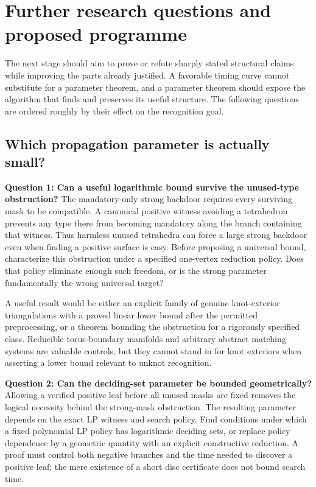 \section{Further research questions and proposed programme}\label{sec:research}

The next stage should aim to prove or refute sharply stated structural claims while improving the parts already justified. A favorable timing curve cannot substitute for a parameter theorem, and a parameter theorem should expose the algorithm that finds and preserves its useful structure. The following questions are ordered roughly by their effect on the recognition goal.

\subsection{Which propagation parameter is actually small?}

\textbf{Question 1: Can a useful logarithmic bound survive the unused-type obstruction?}
The mandatory-only strong backdoor requires every surviving mask to be compatible. A canonical positive witness avoiding a tetrahedron prevents any type there from becoming mandatory along the branch containing that witness. Thus harmless unused tetrahedra can force a large strong backdoor even when finding a positive surface is easy. Before proposing a universal bound, characterize this obstruction under a specified one-vertex reduction policy. Does that policy eliminate enough such freedom, or is the strong parameter fundamentally the wrong universal target?

A useful result would be either an explicit family of genuine knot-exterior triangulations with a proved linear lower bound after the permitted preprocessing, or a theorem bounding the obstruction for a rigorously specified class. Reducible torus-boundary manifolds and arbitrary abstract matching systems are valuable controls, but they cannot stand in for knot exteriors when asserting a lower bound relevant to unknot recognition.

\textbf{Question 2: Can the deciding-set parameter be bounded geometrically?}
Allowing a verified positive leaf before all unused masks are fixed removes the logical necessity behind the strong-mask obstruction. The resulting parameter depends on the exact LP witness and search policy. Find conditions under which a fixed polynomial LP policy has logarithmic deciding sets, or replace policy dependence by a geometric quantity with an explicit constructive reduction. A proof must control both negative branches and the time needed to discover a positive leaf; the mere existence of a short disc certificate does not bound search time.

